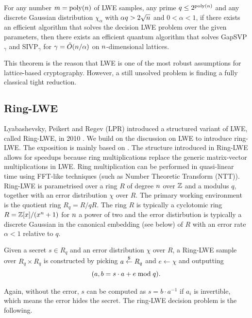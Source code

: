 \begin{theorem}
    For any number $m = \operatorname{poly}(n)$ of LWE samples, any prime $q \leq 2^{\operatorname{poly}(n)}$ and any discrete Gaussian distribution $\chi_\alpha$ with $\alpha q > 2 \sqrt{n}$ and $0 < \alpha < 1$, if there exists an efficient algorithm that solves the decision LWE problem over the given parameters, then there exists an efficient quantum algorithm that solves GapSVP$_\gamma$ and SIVP$_\gamma$ for $\gamma = \tilde{O}(n/\alpha)$ on $n$-dimensional lattices.
\end{theorem}

This theorem is the reason that LWE is one of the most robust assumptions for lattice-based cryptography. However, a still unsolved problem is finding a fully classical tight reduction. 

\subsection{Ring-LWE}
Lyabashevsky, Peikert and Regev (LPR) introduced a structured variant of LWE, called Ring-LWE, in 2010 \cite{lpr10}. We build on the discussion on LWE to introduce ring-LWE. The exposition is mainly based on \cite{peikert_dec}. The structure introduced in Ring-LWE allows for speedups because ring multiplications replace the generic matrix-vector multiplications in LWE. Ring multiplication can be performed in quasi-linear time using FFT-like techniques (such as Number Theoretic Transform (NTT)). Ring-LWE is parametrised over a ring $R$ of degree $n$ over $\mathbb{Z}$ and a modulus $q$, together with an error distribution $\chi$ over $R$. The primary working environment is the quotient ring $R_q = R/qR$. The ring $R$ is typically a cyclotomic ring $R = \mathbb{Z}[x]/(x^{n} + 1)$ for $n$ a power of two and the error distirbution is typically a discrete Gaussian in the canonical embedding (see below) of $R$ with an error rate $\alpha < 1$ relative to $q$.

\begin{definition}
    Given a secret $s \in R_q$ and an error distribution $\chi$ over $R$, a Ring-LWE sample over $R_q \times R_q$ is constructed by picking $a \overset{\$}{\leftarrow} R_q$ and $e \leftarrow \chi$ and outputting \[ (a, b = s \cdot a + e \mathrm{\; mod \;} q). \]
\end{definition}

Again, without the error, $s$ can be computed as $s = b \cdot a^{-1}$ if $a_i$ is invertible, which means the error hides the secret. The ring-LWE decision problem is the following.

